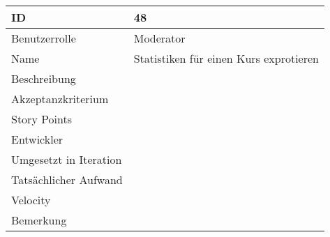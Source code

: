 \begin{tabularx}{\textwidth}{|p{}|X|}
	\hline
	ID & 48\\
	\hline
	Benutzerrolle & Moderator\\
	\hline
	Name & Statistiken für einen Kurs exprotieren\\
	\hline
	Beschreibung & \\
	\hline
	Akzeptanzkriterium & \\
	\hline
	Story Points & \\
	\hline
	Entwickler & \\
	\hline
	Umgesetzt in Iteration & \\ 
	\hline
	Tatsächlicher Aufwand & \\
	\hline
	Velocity & \\
	\hline
	Bemerkung & \\
	\hline
\end{tabularx}
\vspace{20pt}
